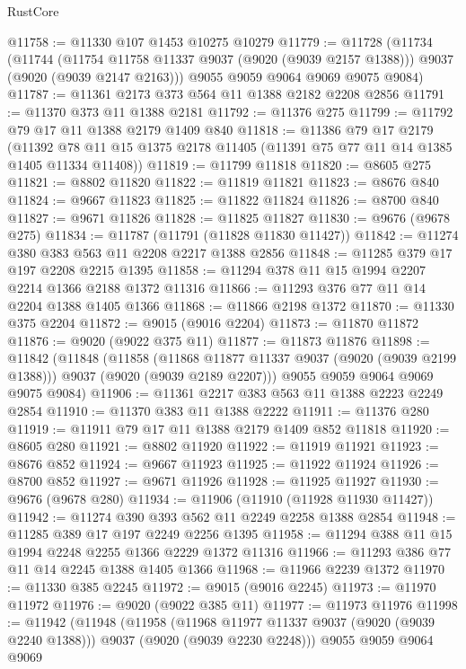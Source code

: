 \begin{lexlean}{RustCore}
\begin{coremodule}
@11758 := @11330 @107 @1453 @10275 @10279
@11779 := @11728
    (@11734
      (@11744
        (@11754 @11758 @11337 @9037 (@9020 (@9039 @2157 @1388)))
        @9037
        (@9020 (@9039 @2147 @2163)))
      @9055
      @9059
      @9064
      @9069
      @9075
      @9084)
@11787 := @11361 @2173 @373 @564 @11 @1388 @2182 @2208 @2856
@11791 := @11370 @373 @11 @1388 @2181
@11792 := @11376 @275
@11799 := @11792 @79 @17 @11 @1388 @2179 @1409 @840
@11818 := @11386
    @79
    @17
    @2179
    (@11392 @78 @11 @15 @1375 @2178 @11405 (@11391 @75 @77 @11 @14 @1385 @1405 @11334 @11408))
@11819 := @11799 @11818
@11820 := @8605 @275
@11821 := @8802 @11820
@11822 := @11819 @11821
@11823 := @8676 @840
@11824 := @9667 @11823
@11825 := @11822 @11824
@11826 := @8700 @840
@11827 := @9671 @11826
@11828 := @11825 @11827
@11830 := @9676 (@9678 @275)
@11834 := @11787 (@11791 (@11828 @11830 @11427))
@11842 := @11274 @380 @383 @563 @11 @2208 @2217 @1388 @2856
@11848 := @11285 @379 @17 @197 @2208 @2215 @1395
@11858 := @11294 @378 @11 @15 @1994 @2207 @2214 @1366 @2188 @1372 @11316
@11866 := @11293 @376 @77 @11 @14 @2204 @1388 @1405 @1366
@11868 := @11866 @2198 @1372
@11870 := @11330 @375 @2204
@11872 := @9015 (@9016 @2204)
@11873 := @11870 @11872
@11876 := @9020 (@9022 @375 @11)
@11877 := @11873 @11876
@11898 := @11842
    (@11848
      (@11858
        (@11868 @11877 @11337 @9037 (@9020 (@9039 @2199 @1388)))
        @9037
        (@9020 (@9039 @2189 @2207)))
      @9055
      @9059
      @9064
      @9069
      @9075
      @9084)
@11906 := @11361 @2217 @383 @563 @11 @1388 @2223 @2249 @2854
@11910 := @11370 @383 @11 @1388 @2222
@11911 := @11376 @280
@11919 := @11911 @79 @17 @11 @1388 @2179 @1409 @852 @11818
@11920 := @8605 @280
@11921 := @8802 @11920
@11922 := @11919 @11921
@11923 := @8676 @852
@11924 := @9667 @11923
@11925 := @11922 @11924
@11926 := @8700 @852
@11927 := @9671 @11926
@11928 := @11925 @11927
@11930 := @9676 (@9678 @280)
@11934 := @11906 (@11910 (@11928 @11930 @11427))
@11942 := @11274 @390 @393 @562 @11 @2249 @2258 @1388 @2854
@11948 := @11285 @389 @17 @197 @2249 @2256 @1395
@11958 := @11294 @388 @11 @15 @1994 @2248 @2255 @1366 @2229 @1372 @11316
@11966 := @11293 @386 @77 @11 @14 @2245 @1388 @1405 @1366
@11968 := @11966 @2239 @1372
@11970 := @11330 @385 @2245
@11972 := @9015 (@9016 @2245)
@11973 := @11970 @11972
@11976 := @9020 (@9022 @385 @11)
@11977 := @11973 @11976
@11998 := @11942
    (@11948
      (@11958
        (@11968 @11977 @11337 @9037 (@9020 (@9039 @2240 @1388)))
        @9037
        (@9020 (@9039 @2230 @2248)))
      @9055
      @9059
      @9064
      @9069

\end{coremodule}
\end{lexlean}
